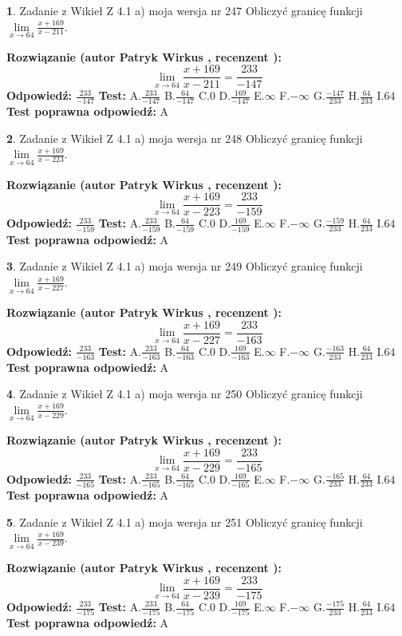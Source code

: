 \documentclass[12pt, a4paper]{article}
\theoremstyle{definition} %
\newtheorem{zad}{}
\newcommand{\zadStart}[1]{\begin{zad}#1\newline}
\newcommand{\zadStop}{\end{zad}}
\newcommand{\rozwStart}[2]{\noindent \textbf{Rozwiązanie (autor #1 , recenzent #2): }\newline}
\newcommand{\rozwStop}{\newline}
\newcommand{\odpStart}{\noindent \textbf{Odpowiedź:}\newline}
\newcommand{\odpStop}{\newline}
\newcommand{\testStart}{\noindent \textbf{Test:}\newline}
\newcommand{\testStop}{\newline}
\newcommand{\kluczStart}{\noindent \textbf{Test poprawna odpowiedź:}\newline}
\newcommand{\kluczStop}{\newline}
\begin{document}
\zadStart{Zadanie z Wikieł Z 4.1 a) moja wersja nr 247}
Obliczyć granicę funkcji $\lim\limits_{x\to64}\frac{x+169}{x-211}$.
\zadStop
\rozwStart{Patryk Wirkus}{}
$$\lim\limits_{x\to64}\frac{x+169}{x-211} = \frac{233}{-147}$$
\rozwStop
\odpStart
$\frac{233}{-147}$
\odpStop
\testStart
A.$\frac{233}{-147}$
B.$\frac{64}{-147}$
C.$0$
D.$\frac{169}{-147}$
E.$\infty$
F.$-\infty$
G.$\frac{-147}{233}$
H.$\frac{64}{233}$
I.$64$
\testStop
\kluczStart
A
\kluczStop



\zadStart{Zadanie z Wikieł Z 4.1 a) moja wersja nr 248}
Obliczyć granicę funkcji $\lim\limits_{x\to64}\frac{x+169}{x-223}$.
\zadStop
\rozwStart{Patryk Wirkus}{}
$$\lim\limits_{x\to64}\frac{x+169}{x-223} = \frac{233}{-159}$$
\rozwStop
\odpStart
$\frac{233}{-159}$
\odpStop
\testStart
A.$\frac{233}{-159}$
B.$\frac{64}{-159}$
C.$0$
D.$\frac{169}{-159}$
E.$\infty$
F.$-\infty$
G.$\frac{-159}{233}$
H.$\frac{64}{233}$
I.$64$
\testStop
\kluczStart
A
\kluczStop



\zadStart{Zadanie z Wikieł Z 4.1 a) moja wersja nr 249}
Obliczyć granicę funkcji $\lim\limits_{x\to64}\frac{x+169}{x-227}$.
\zadStop
\rozwStart{Patryk Wirkus}{}
$$\lim\limits_{x\to64}\frac{x+169}{x-227} = \frac{233}{-163}$$
\rozwStop
\odpStart
$\frac{233}{-163}$
\odpStop
\testStart
A.$\frac{233}{-163}$
B.$\frac{64}{-163}$
C.$0$
D.$\frac{169}{-163}$
E.$\infty$
F.$-\infty$
G.$\frac{-163}{233}$
H.$\frac{64}{233}$
I.$64$
\testStop
\kluczStart
A
\kluczStop



\zadStart{Zadanie z Wikieł Z 4.1 a) moja wersja nr 250}
Obliczyć granicę funkcji $\lim\limits_{x\to64}\frac{x+169}{x-229}$.
\zadStop
\rozwStart{Patryk Wirkus}{}
$$\lim\limits_{x\to64}\frac{x+169}{x-229} = \frac{233}{-165}$$
\rozwStop
\odpStart
$\frac{233}{-165}$
\odpStop
\testStart
A.$\frac{233}{-165}$
B.$\frac{64}{-165}$
C.$0$
D.$\frac{169}{-165}$
E.$\infty$
F.$-\infty$
G.$\frac{-165}{233}$
H.$\frac{64}{233}$
I.$64$
\testStop
\kluczStart
A
\kluczStop



\zadStart{Zadanie z Wikieł Z 4.1 a) moja wersja nr 251}
Obliczyć granicę funkcji $\lim\limits_{x\to64}\frac{x+169}{x-239}$.
\zadStop
\rozwStart{Patryk Wirkus}{}
$$\lim\limits_{x\to64}\frac{x+169}{x-239} = \frac{233}{-175}$$
\rozwStop
\odpStart
$\frac{233}{-175}$
\odpStop
\testStart
A.$\frac{233}{-175}$
B.$\frac{64}{-175}$
C.$0$
D.$\frac{169}{-175}$
E.$\infty$
F.$-\infty$
G.$\frac{-175}{233}$
H.$\frac{64}{233}$
I.$64$
\testStop
\kluczStart
A
\kluczStop
\end{document}
